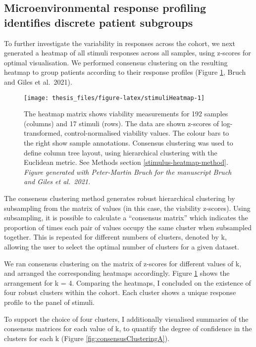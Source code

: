 \documentclass[11pt, a4paper, twosided]{book}
\begin{document}
\hypertarget{clusters}{%
\subsection{Microenvironmental response profiling identifies discrete patient subgroups}\label{clusters}}

To further investigate the variability in responses across the cohort, we next generated a heatmap of all stimuli responses across all samples, using z-scores for optimal visualisation. We performed consensus clustering on the resulting heatmap to group patients according to their response profiles (Figure \ref{fig:stimuliHeatmap}, Bruch and Giles et al.~2021).


\begin{figure}

{\centering \texttt{[image: thesis\_files/figure-latex/stimuliHeatmap-1]} 

}

\caption{The heatmap matrix shows viability measurements for 192 samples (columns) and 17 stimuli (rows). The data are shown z-scores of log-transformed, control-normalised viability values. The colour bars to the right show sample annotations. Consensus clustering was used to define column tree layout, using hierarchical clustering with the Euclidean metric. See Methods section \ref{stimulus-heatmap-method}. \emph{Figure generated with Peter-Martin Bruch for the manuscript Bruch and Giles et al.~2021. }}\label{fig:stimuliHeatmap}
\end{figure}
The consensus clustering method generates robust hierarchical clustering by subsampling from the matrix of values (in this case, the viability z-scores). Using subsampling, it is possible to calculate a ``consensus matrix'' which indicates the proportion of times each pair of values occupy the same cluster when subsampled together. This is repeated for different numbers of clusters, denoted by k, allowing the user to select the optimal number of clusters for a given dataset.

We ran consensus clustering on the matrix of z-scores for different values of k, and arranged the corresponding heatmaps accordingly. Figure \ref{fig:stimuliHeatmap} shows the arrangement for k = 4. Comparing the heatmaps, I concluded on the existence of four robust clusters within the cohort. Each cluster shows a unique response profile to the panel of stimuli.

To support the choice of four clusters, I additionally visualised summaries of the consensus matrices for each value of k, to quantify the degree of confidence in the clusters for each k (Figure \ref{fig:consensusClusteringA}).
\end{document}
